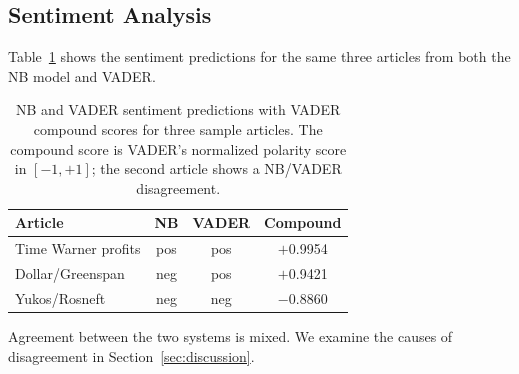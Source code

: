 \FloatBarrier

\subsection{Sentiment Analysis}

Table~\ref{tab:sentiment} shows the sentiment predictions for the same three articles from both the NB model and VADER.

\begin{table}[h]
\centering
\begin{tabular}{lccc}
\toprule
\textbf{Article} & \textbf{NB} & \textbf{VADER} & \textbf{Compound} \\
\midrule
Time Warner profits & pos & pos & $+$0.9954 \\
Dollar/Greenspan    & neg & pos & $+$0.9421 \\
Yukos/Rosneft       & neg & neg & $-$0.8860 \\
\bottomrule
\end{tabular}
\caption{NB and VADER sentiment predictions with VADER compound scores for three sample articles. The compound score is VADER's normalized polarity score in $[-1, +1]$; the second article shows a NB/VADER disagreement.}
\label{tab:sentiment}
\end{table}

Agreement between the two systems is mixed. We examine the causes of disagreement in Section~\ref{sec:discussion}.

\FloatBarrier
